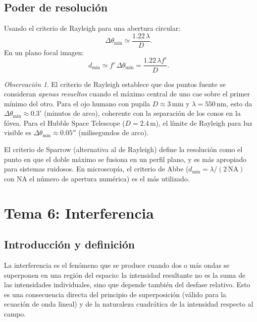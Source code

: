 \documentclass[12pt, a4paper]{article}
\theoremstyle{plain}
\theoremstyle{definition}
\theoremstyle{remark}
\newtheorem*{observacion}{Observación}
\begin{document}
\subsection{Poder de resolución}

Usando el criterio de Rayleigh para una abertura circular:
\begin{equation}
  \Delta\theta_{\min}\simeq\frac{1.22\,\lambda}{D}.
  \label{eq:rayleigh_angular_t5}
\end{equation}
En un plano focal imagen:
\begin{equation}
  d_{\min}\simeq f'\,\Delta\theta_{\min}
  =\frac{1.22\,\lambda f'}{D}.
  \label{eq:rayleigh_lineal_t5}
\end{equation}

\begin{observacion}
El criterio de Rayleigh establece que dos puntos fuente se consideran
\emph{apenas resueltos} cuando el máximo central de uno cae sobre el
primer mínimo del otro. Para el ojo humano con pupila $D \approx 3\,\text{mm}$
y $\lambda = 550\,\text{nm}$, esto da $\Delta\theta_{\min} \approx 0.3'$
(minutos de arco), coherente con la separación de los conos en la fóvea.
Para el Hubble Space Telescope ($D = 2.4\,\text{m}$), el límite de Rayleigh
para luz visible es $\Delta\theta_{\min} \approx 0.05''$ (milisegundos de arco).

El criterio de Sparrow (alternativa al de Rayleigh) define la resolución
como el punto en que el doble máximo se fusiona en un perfil plano, y es
más apropiado para sistemas ruidosos. En microscopía, el criterio de Abbe
($d_{\min} = \lambda/(2\,\text{NA})$ con NA el número de apertura numérica)
es el más utilizado.
\end{observacion}

\section{Tema 6: Interferencia}

\subsection{Introducción y definición}

La interferencia es el fenómeno que se produce cuando dos o más ondas se
superponen en una región del espacio: la intensidad resultante no es la suma
de las intensidades individuales, sino que depende también del desfase relativo.
Esto es una consecuencia directa del principio de superposición (válido para
la ecuación de onda lineal) y de la naturaleza cuadrática de la intensidad
respecto al campo.
\end{document}
